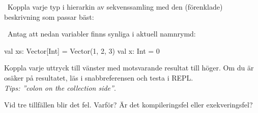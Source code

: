 \QUESTEND





\QUESTBEGIN

\Task \what~Koppla varje typ i hierarkin av sekvenssamling med den (förenklade) beskrivning som passar bäst:

\begin{ConceptConnections}

\end{ConceptConnections}

\SOLUTION

\TaskSolved \what

\begin{ConceptConnections}

\end{ConceptConnections}

\QUESTEND



\QUESTBEGIN

\Task \what~Antag att nedan variabler finns synliga i aktuell namnrymd:
\begin{Code}
val xs: Vector[Int] = Vector(1, 2, 3)
val x: Int = 0
\end{Code}

\Subtask Koppla varje uttryck till vänster med motsvarande resultat till höger. Om du är osäker på resultatet, läs i snabbreferensen och testa i REPL. \\\emph{Tips: ''colon on the collection side''}.

\begin{ConceptConnections}

\end{ConceptConnections}

\Subtask Vid tre tillfällen blir det fel. Varför? Är det kompileringsfel eller exekveringsfel?

\SOLUTION

\TaskSolved \what

\SubtaskSolved

\begin{ConceptConnections}

\end{ConceptConnections}

\SubtaskSolved

